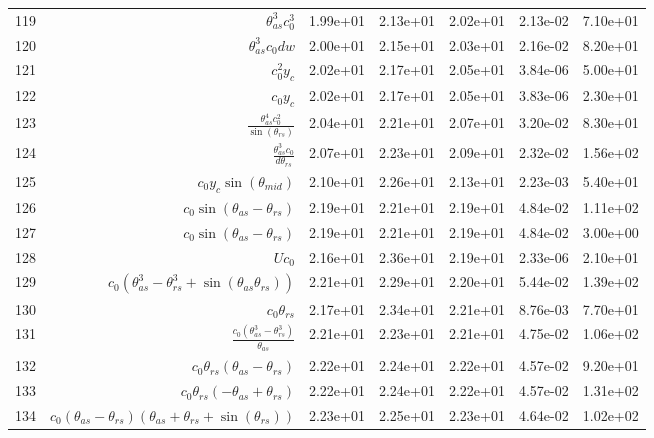 \begin{tabularx}{\textwidth}{lRRRRRl}
119  &  $ \theta_{as}^{3} c_{0}^{3} $  &  1.99e+01  &  2.13e+01  &  2.02e+01  &  2.13e-02  &  7.10e+01  \\ 
120  &  $ \theta_{as}^{3} c_{0} d w $  &  2.00e+01  &  2.15e+01  &  2.03e+01  &  2.16e-02  &  8.20e+01  \\ 
121  &  $ c_{0}^{2} y_c $  &  2.02e+01  &  2.17e+01  &  2.05e+01  &  3.84e-06  &  5.00e+01  \\ 
122  &  $ c_{0} y_c $  &  2.02e+01  &  2.17e+01  &  2.05e+01  &  3.83e-06  &  2.30e+01  \\ 
123  &  $ \displaystyle\frac{\theta_{as}^{4} c_{0}^{2}}{\sin{\left(\theta_{rs} \right)}} $  &  2.04e+01  &  2.21e+01  &  2.07e+01  &  3.20e-02  &  8.30e+01  \\ 
124  &  $ \displaystyle\frac{\theta_{as}^{3} c_{0}}{d \theta_{rs}} $  &  2.07e+01  &  2.23e+01  &  2.09e+01  &  2.32e-02  &  1.56e+02  \\ 
125  &  $ c_{0} y_c \sin{\left(\theta_{mid} \right)} $  &  2.10e+01  &  2.26e+01  &  2.13e+01  &  2.23e-03  &  5.40e+01  \\ 
126  &  $ c_{0} \sin{\left(\theta_{as} - \theta_{rs} \right)} $  &  2.19e+01  &  2.21e+01  &  2.19e+01  &  4.84e-02  &  1.11e+02  \\ 
127  &  $ c_{0} \sin{\left(\theta_{as} - \theta_{rs} \right)} $  &  2.19e+01  &  2.21e+01  &  2.19e+01  &  4.84e-02  &  3.00e+00  \\ 
128  &  $ U c_{0} $  &  2.16e+01  &  2.36e+01  &  2.19e+01  &  2.33e-06  &  2.10e+01  \\ 
129  &  $ c_{0} \left(\theta_{as}^{3} - \theta_{rs}^{3} + \sin{\left(\theta_{as} \theta_{rs} \right)}\right) $  &  2.21e+01  &  2.29e+01  &  2.20e+01  &  5.44e-02  &  1.39e+02  \\ 
130  &  $ c_{0} \theta_{rs} $  &  2.17e+01  &  2.34e+01  &  2.21e+01  &  8.76e-03  &  7.70e+01  \\ 
131  &  $ \displaystyle\frac{c_{0} \left(\theta_{as}^{3} - \theta_{rs}^{3}\right)}{\theta_{as}} $  &  2.21e+01  &  2.23e+01  &  2.21e+01  &  4.75e-02  &  1.06e+02  \\ 
132  &  $ c_{0} \theta_{rs} \left(\theta_{as} - \theta_{rs}\right) $  &  2.22e+01  &  2.24e+01  &  2.22e+01  &  4.57e-02  &  9.20e+01  \\ 
133  &  $ c_{0} \theta_{rs} \left(- \theta_{as} + \theta_{rs}\right) $  &  2.22e+01  &  2.24e+01  &  2.22e+01  &  4.57e-02  &  1.31e+02  \\ 
134  &  $ c_{0} \left(\theta_{as} - \theta_{rs}\right) \left(\theta_{as} + \theta_{rs} + \sin{\left(\theta_{rs} \right)}\right) $  &  2.23e+01  &  2.25e+01  &  2.23e+01  &  4.64e-02  &  1.02e+02  \\ 

\end{tabularx}
